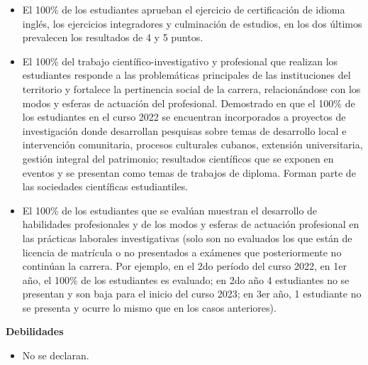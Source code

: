 \begin{itemize}
	\item El 100\% de los estudiantes aprueban el ejercicio de certificación de idioma inglés, los ejercicios integradores y culminación de estudios, en los dos últimos prevalecen los resultados de 4 y 5 puntos. 
	
	\item El 100\% del trabajo científico-investigativo y profesional que realizan los estudiantes responde a las problemáticas principales de las instituciones del territorio y fortalece la pertinencia social de la carrera, relacionándose con los modos y esferas de actuación del profesional. Demostrado en que el 100\% de los estudiantes en el curso 2022 se encuentran incorporados a proyectos de investigación donde desarrollan pesquisas sobre temas de desarrollo local e intervención comunitaria, procesos culturales cubanos, extensión universitaria, gestión integral del patrimonio; resultados científicos que se exponen en eventos y se presentan como temas de trabajos de diploma. Forman parte de las sociedades científicas estudiantiles.
	
	\item El 100\% de los estudiantes que se evalúan muestran el desarrollo de habilidades profesionales y de los modos y esferas de actuación profesional en las prácticas laborales investigativas (solo son no evaluados los que están de licencia de matrícula o no presentados a exámenes que posteriormente no continúan la carrera. Por ejemplo, en el 2do período del curso 2022, en 1er año, el 100\% de los estudiantes es evaluado; en 2do año 4 estudiantes no se presentan y son baja para el inicio del curso 2023; en 3er año, 1 estudiante no se presenta y ocurre lo mismo que en los casos anteriores).
\end{itemize}

\textbf{Debilidades}

\begin{itemize}
	\item No se declaran.
\end{itemize}
